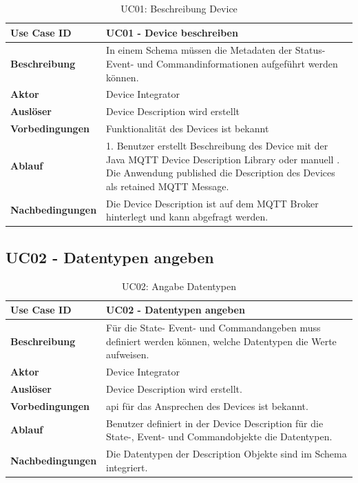 \begin{table}[H]
\begin{tabularx}{\textwidth}{|l|X|}

 \hline
 {\bf Use Case ID }    & UC01 - Device beschreiben \\  \hline
 {\bf Beschreibung }   & In einem Schema müssen die Metadaten der Status- Event- und Commandinformationen aufgeführt werden können.
 \\ \hline
 {\bf Aktor }          & Device Integrator \\ \hline
 {\bf Auslöser }       & Device Description wird erstellt \\ \hline
 {\bf Vorbedingungen } & Funktionalität des Devices ist bekannt \\ \hline
 {\bf Ablauf }         & 
     1. Benutzer erstellt Beschreibung des Device mit der Java MQTT Device Description Library oder manuell \newline                                             
     2. Die Anwendung published die Description des Devices als retained MQTT Message.  \\ \hline
 {\bf Nachbedingungen} & Die Device Description ist auf dem MQTT Broker hinterlegt und kann abgefragt werden. \\ \hline
  
\end{tabularx}
\caption{UC01: Beschreibung Device}
\end{table}

\subsection{UC02 - Datentypen angeben}

\begin{table}[H]
\begin{tabularx}{\textwidth}{|l|X|}

 \hline
 {\bf Use Case ID }    & UC02 - Datentypen angeben \\  \hline
 {\bf Beschreibung }   & Für die State- Event- und Commandangeben muss definiert werden können, welche Datentypen die Werte aufweisen. \\ \hline
 {\bf Aktor }          & Device Integrator \\ \hline
 {\bf Auslöser }       & Device Description wird erstellt. \\ \hline
 {\bf Vorbedingungen } & \gls{api} für das Ansprechen des Devices ist bekannt. \\ \hline
 {\bf Ablauf }         & Benutzer definiert in der Device Description für die State-, Event- und Commandobjekte die Datentypen. \\ \hline
 {\bf Nachbedingungen} &  Die Datentypen der Description Objekte sind im Schema integriert. \\ \hline
  
\end{tabularx}
\caption{UC02: Angabe Datentypen}
\end{table}

